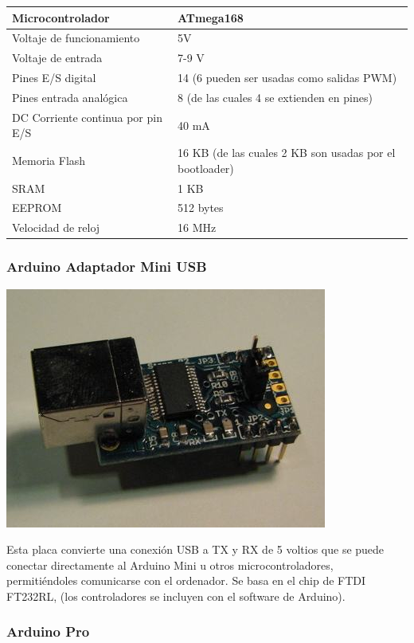 \documentclass[12pt,a4papert,woside,openright,titlepage,final]{book}
\begin{document}
\begin{tabular}{||l | l ||}
\hline
\hline
Microcontrolador & ATmega168\\
\hline
Voltaje de funcionamiento & 5V\\
\hline
Voltaje de entrada & 7-9 V\\
\hline
Pines E/S digital & 14 (6 pueden ser usadas como salidas PWM)\\
\hline
Pines entrada analógica & 8 (de las cuales 4 se extienden en pines)\\
\hline
DC Corriente continua por pin E/S & 40 mA\\
\hline
Memoria Flash & 16 KB (de las cuales 2 KB son usadas por el bootloader)\\
\hline
SRAM & 1 KB\\
\hline
EEPROM & 512 bytes\\
\hline
Velocidad de reloj & 16 MHz\\
\hline
\hline
\end{tabular}

\subsubsection{Arduino Adaptador Mini USB}

\includegraphics[scale=0.6]{mini_usb.jpg}

Esta placa convierte una conexión USB a TX y RX de 5 voltios que se puede
conectar directamente al Arduino Mini u otros microcontroladores, permitiéndoles
comunicarse con el ordenador. Se basa en el chip de FTDI FT232RL, (los
controladores se incluyen con el software de Arduino).

\subsubsection{Arduino Pro}
\end{document}

